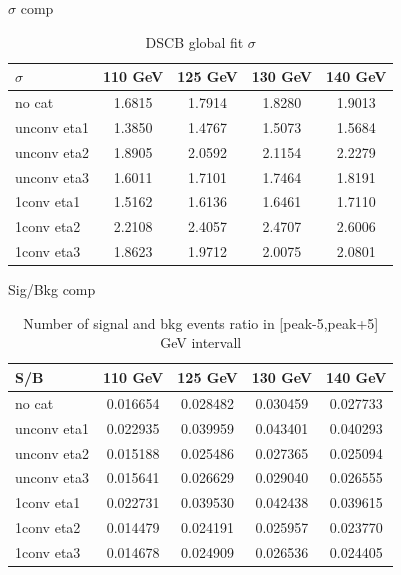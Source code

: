 \documentclass[10pt,UKenglish, leqno, xcolor = dvipsnames]{beamer}
\begin{document}
		\begin{frame}{$\sigma$ comp}
			\vfill
			\centering
			\begin{table}[tbp]
				\centering
				\begin{tabular}{lcccc}
					\toprule[1.5pt]
					$\sigma$	& 110 GeV	& 125 GeV	& 130 GeV	& 140 GeV	\\
					\midrule
					no cat 		& 1.6815 	& 1.7914	& 1.8280	& 1.9013	\\
					unconv eta1 & 1.3850	& 1.4767	& 1.5073	& 1.5684	\\
					unconv eta2 & 1.8905	& 2.0592	& 2.1154	& 2.2279	\\
					unconv eta3 & 1.6011	& 1.7101	& 1.7464	& 1.8191	\\ 
					1conv eta1 	& 1.5162	& 1.6136	& 1.6461	& 1.7110	\\
					1conv eta2 	& 2.2108	& 2.4057	& 2.4707	& 2.6006	\\
					1conv eta3	& 1.8623	& 1.9712	& 2.0075	& 2.0801 	\\
					\bottomrule[1.5pt]
				\end{tabular}
				\caption{DSCB global fit $\sigma$}
			\end{table}
			\vfill
		\end{frame}
	
		\begin{frame}{Sig/Bkg comp}
			\vfill
			\centering
			\begin{table}[tbp]
				\centering
				\begin{tabular}{lcccc}
					\toprule[1.5pt]
					S/B			& 110 GeV	& 125 GeV	& 130 GeV	& 140 GeV	\\
					\midrule
					no cat 		& 0.016654	& 0.028482	& 0.030459	& 0.027733	\\
					unconv eta1 & 0.022935	& 0.039959	& 0.043401	& 0.040293	\\
					unconv eta2 & 0.015188	& 0.025486	& 0.027365	& 0.025094	\\
					unconv eta3 & 0.015641	& 0.026629	& 0.029040	& 0.026555	\\
					1conv eta1 	& 0.022731	& 0.039530	& 0.042438	& 0.039615	\\
					1conv eta2 	& 0.014479	& 0.024191	& 0.025957	& 0.023770	\\
					1conv eta3	& 0.014678	& 0.024909	& 0.026536	& 0.024405	\\
					\bottomrule[1.5pt]
				\end{tabular}
				\caption{Number of signal and bkg events ratio in [peak-5,peak+5] GeV intervall}
			\end{table}
			\vfill
		\end{frame}
	 
\end{document}
